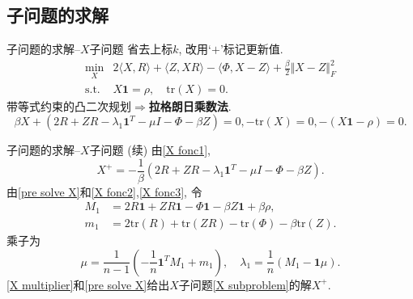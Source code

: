 \documentclass{beamer}
\newcommand*{\beq}[1]{{\textcolor[rgb]{0,0,0.67}{\eqref{#1}}}}
\newcommand{\trace}{\mathrm{tr}}
\newcommand{\st}{\mathrm{s.t.}}
\newcommand{\one}{\mathbf{1}}
\begin{document}
\subsection{子问题的求解}
\begin{frame}{子问题的求解--$X$子问题}
省去上标$k$, 改用`$+$'标记更新值. 
\begin{equation}
	\begin{array}{rl}
		\min\limits_X & 2\langle X,R\rangle+\langle Z,XR\rangle-\langle\Phi,X-Z\rangle+\frac{\beta}{2}\Vert X-Z\Vert_F^2\\
		\st & X\one=\rho,\quad\trace(X)=0.
	\end{array}
	\label{X subproblem}
\end{equation}
带等式约束的凸二次规划\pause$\Rightarrow$\textbf{拉格朗日乘数法}.
\begin{subequations}
	\begin{equation}
	\beta X+(2R+ZR-\lambda_1\one^T-\mu I-\Phi-\beta Z)=0,\label{X fonc1}
	\end{equation}
	\begin{equation}
	-\trace(X)=0,\label{X fonc2}
	\end{equation}
	\begin{equation}
	-(X\one-\rho)=0.\label{X fonc3}
	\end{equation}
\end{subequations}
\end{frame}

\begin{frame}{子问题的求解--$X$子问题 (续)}
由\beq{X fonc1}, 
\begin{equation}
	X^+=-\frac{1}{\beta}(2R+ZR-\lambda_1\one^T-\mu I-\Phi-\beta Z).\label{pre solve X}
\end{equation}
由\beq{pre solve X}和\beq{X fonc2},\beq{X fonc3}, 令
$$\begin{aligned}
	M_1&=2R\one+ZR\one-\Phi\one-\beta Z\one+\beta\rho,\\
	m_1&=2\trace(R)+\trace(ZR)-\trace(\Phi)-\beta\trace(Z).
\end{aligned}$$
乘子为
\begin{equation}
	\mu=\frac{1}{n-1}\left(-\frac{1}{n}\one^TM_1+m_1\right),\quad\lambda_1=\frac{1}{n}(M_1-\one\mu).\label{X multiplier}
\end{equation}
\beq{X multiplier}和\beq{pre solve X}给出$X$子问题\beq{X subproblem}的解$X^+$.
\end{frame}
\end{document}

